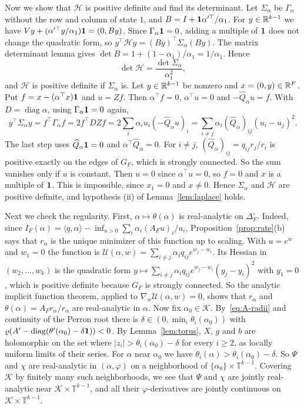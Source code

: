 Now we show that $\mathcal H$ is positive definite and find its determinant.
Let $\Sigma_\alpha$ be $\Gamma_\alpha$ without the row and column of state
$1$, and $B=I+\mathbf{1}\alpha'^\top/\alpha_1$. For $y\in\mathbb{R}^{k-1}$ we have
$Vy+(\alpha'^\top y/\alpha_1)\mathbf{1}=(0,By)$. Since $\Gamma_\alpha\mathbf{1}=0$,
adding a multiple of $\mathbf{1}$ does not change the quadratic form, so
$y^\top\mathcal Hy=(By)^\top\Sigma_\alpha(By)$. The matrix determinant lemma
gives $\det B=1+(1-\alpha_1)/\alpha_1=1/\alpha_1$. Hence
\[
\det\mathcal H=\frac{\det\Sigma_\alpha}{\alpha_1^2},
\]
and $\mathcal H$ is positive definite if $\Sigma_\alpha$ is. Let
$y\in\mathbb{R}^{k-1}$ be nonzero and $x=(0,y)\in\mathbb{R}^F$. Put
$f=x-(\alpha^\top x)\mathbf{1}$ and $u=Zf$. Then $\alpha^\top f=0$,
$\alpha^\top u=0$ and $-\widehat Q_\alpha u=f$. With
$D=\operatorname{diag}\alpha$, using $\Gamma_\alpha\mathbf{1}=0$ again,
\[
y^\top\Sigma_\alpha y=f^\top\Gamma_\alpha f=2f^\top DZf
=2\sum_i\alpha_iu_i(-\widehat Q_\alpha u)_i
=\sum_{i\ne j}\alpha_i(\widehat Q_\alpha)_{ij}(u_i-u_j)^2 .
\]
The last step uses $\widehat Q_\alpha\mathbf{1}=0$ and
$\alpha^\top\widehat Q_\alpha=0$. For $i\ne j$,
$(\widehat Q_\alpha)_{ij}=q_{ij}r_j/r_i$ is positive exactly on the edges of
$G_F$, which is strongly connected. So the sum vanishes only if $u$ is
constant. Then $u=0$ since $\alpha^\top u=0$, so $f=0$ and $x$ is a multiple
of $\mathbf{1}$. This is impossible, since $x_1=0$ and $x\ne0$. Hence
$\Sigma_\alpha$ and $\mathcal H$ are positive definite, and hypothesis (ii)
of Lemma~\ref{lem:laplace} holds.

Next we check the regularity. First, $\alpha\mapsto\theta(\alpha)$ is
real-analytic on $\Delta_F^\circ$. Indeed, since
$I_F(\alpha)=\langle q,\alpha\rangle-\inf_{u>0}\sum_i\alpha_i(A_Fu)_i/u_i$,
Proposition~\ref{prop:rate}(b) says that $r_\alpha$ is the unique minimizer
of this function up to scaling. With $u=e^w$ and $w_1=0$ the function is
$\mathcal U(\alpha,w)=\sum_{i\ne j}\alpha_iq_{ij}e^{w_j-w_i}$. Its Hessian in
$(w_2,\dots,w_k)$ is the quadratic form
$y\mapsto\sum_{i\ne j}\alpha_iq_{ij}e^{w_j-w_i}(y_j-y_i)^2$ with $y_1=0$,
which is positive definite because $G_F$ is strongly connected. So the
analytic implicit function theorem, applied to
$\nabla_w\mathcal U(\alpha,w)=0$, shows that $r_\alpha$ and
$\theta(\alpha)=A_Fr_\alpha/r_\alpha$ are real-analytic in $\alpha$. Now fix
$\alpha_0\in\mathcal K$. By~\eqref{eq:A-radii} and continuity of the Perron
root there is $\delta\in(0,\min_i\theta_i(\alpha_0))$ with
$\varrho(A'-\operatorname{diag}(\theta'(\alpha_0)-\delta\mathbf{1}))<0$. By
Lemma~\ref{lem:torus}, $X$, $g$ and $b$ are holomorphic on the set where
$\lvert z_i\rvert>\theta_i(\alpha_0)-\delta$ for every $i\ge2$, as locally
uniform limits of their series. For $\alpha$ near $\alpha_0$ we have
$\theta_i(\alpha)>\theta_i(\alpha_0)-\delta$. So $\Psi$ and $\chi$ are
real-analytic in $(\alpha,\varphi)$ on a neighborhood of
$\{\alpha_0\}\times\mathbb T^{k-1}$. Covering $\mathcal K$ by finitely many
such neighborhoods, we see that $\Psi$ and $\chi$ are jointly real-analytic
near $\mathcal K\times\mathbb T^{k-1}$, and all their $\varphi$-derivatives
are jointly continuous on $\mathcal K\times\mathbb T^{k-1}$.

